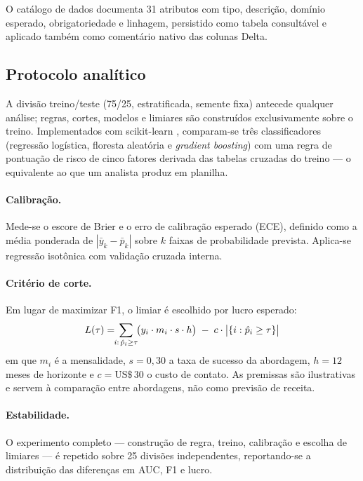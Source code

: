 \documentclass[10pt,a4paper]{article}
\begin{document}
O catálogo de dados documenta 31 atributos com tipo, descrição, domínio esperado,
obrigatoriedade e linhagem, persistido como tabela consultável e aplicado também como
comentário nativo das colunas Delta.

\subsection{Protocolo analítico}

A divisão treino/teste (75/25, estratificada, semente fixa) antecede qualquer análise; regras,
cortes, modelos e limiares são construídos exclusivamente sobre o treino. Implementados com
scikit-learn \cite{pedregosa}, comparam-se três classificadores (regressão logística, floresta
aleatória e \emph{gradient boosting}) com uma regra de pontuação de risco de cinco fatores
derivada das tabelas cruzadas do treino --- o equivalente ao que um analista produz em planilha.

\paragraph{Calibração.} Mede-se o escore de Brier e o erro de calibração esperado (ECE),
definido como a média ponderada de \(|\bar{y}_k - \bar{p}_k|\) sobre \(k\) faixas de
probabilidade prevista. Aplica-se regressão isotônica com validação cruzada interna.

\paragraph{Critério de corte.} Em lugar de maximizar F1, o limiar é escolhido por lucro
esperado:
\begin{equation}
\small
L(\tau) = \!\!\sum_{i:\,\hat{p}_i \geq \tau}\!\! \big(y_i \cdot m_i \cdot s \cdot h\big)
          \;-\; c \cdot \big|\{i : \hat{p}_i \geq \tau\}\big|
\end{equation}
em que \(m_i\) é a mensalidade, \(s = 0{,}30\) a taxa de sucesso da abordagem,
\(h = 12\) meses de horizonte e \(c = \textrm{US\$}\,30\) o custo de contato. As
premissas são ilustrativas e servem à comparação entre abordagens, não como previsão de
receita.

\paragraph{Estabilidade.} O experimento completo --- construção de regra, treino, calibração
e escolha de limiares --- é repetido sobre 25 divisões independentes, reportando-se a
distribuição das diferenças em AUC, F1 e lucro.
\end{document}
